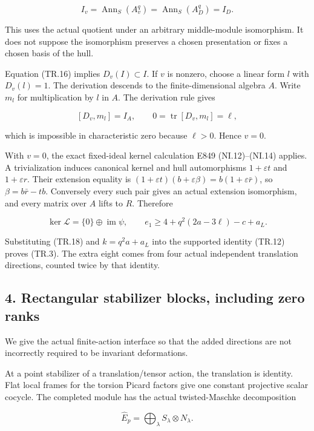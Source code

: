 \[
       I_v=\operatorname{Ann}_S(A_v^q)
          =\operatorname{Ann}_S(A_D^q)=I_D.
 \tag{TR.16}
\]

This uses the actual quotient under an arbitrary middle-module
isomorphism. It does not suppose the isomorphism preserves a chosen
presentation or fixes a chosen basis of the hull.

Equation (TR.16) implies \(D_v(I)\subset I\). If \(v\) is nonzero, choose a linear
form \(l\) with \(D_v(l)=1\). The derivation descends to the finite-dimensional
algebra \(A\). Write \(m_l\) for multiplication by \(l\) in \(A\). The derivation rule
gives

\[
             [D_v,m_l]=I_A,\qquad
             0=\operatorname{tr}[D_v,m_l]=\ell,
 \tag{TR.17}
\]

which is impossible in characteristic zero because \(\ell>0\). Hence \(v=0\).

With \(v=0\), the exact fixed-ideal kernel calculation E849 (NI.12)--(NI.14)
applies. A trivialization induces canonical kernel and hull
automorphisms \(1+\varepsilon t\) and \(1+\varepsilon r\). Their extension equality is
\((1+\varepsilon t)(b+\varepsilon\beta)=b(1+\varepsilon\bar r)\), so \(\beta=b\bar r-tb\).
Conversely every such pair gives an actual extension isomorphism, and
every matrix over \(A\) lifts to \(R\). Therefore

\[
 \ker\mathcal L=\{0\}\oplus\operatorname{im}\psi,\qquad
 e_1\ge4+q^2(2a-3\ell)-c+a_L.
 \tag{TR.18}
\]

Substituting (TR.18) and \(k=q^2a+a_L\) into the supported identity (TR.12)
proves (TR.3). The extra eight comes from four actual independent
translation directions, counted twice by that identity.

\subsection{4. Rectangular stabilizer blocks, including zero ranks}\label{SF-E850:s4}

We give the actual finite-action interface so that the added directions
are not incorrectly required to be invariant deformations.

At a point stabilizer of a translation/tensor action, the translation
is identity. Flat local frames for the torsion Picard factors give
one constant projective scalar cocycle. The completed module has the
actual twisted-Maschke decomposition

\[
                 \widehat E_p=\bigoplus_\lambda
                               S_\lambda\otimes N_\lambda.
 \tag{TR.19}
\]

